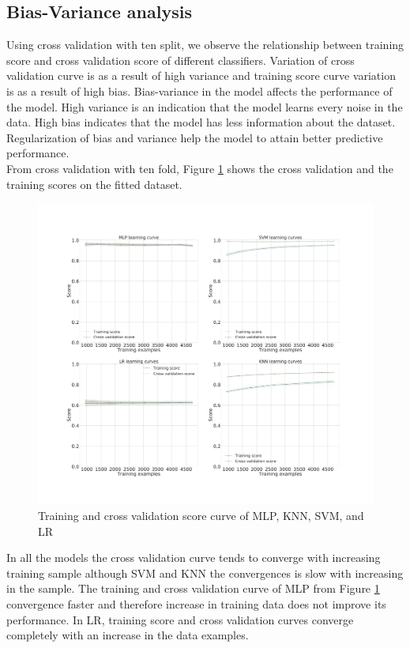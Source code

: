 \documentclass[a4paper,fleqn]{cas-dc}
\begin{document}
\subsection{Bias-Variance analysis}
Using cross validation with ten split, we observe the relationship between training score and cross validation score of different classifiers. Variation of cross validation curve is as a result of high variance and training score curve variation is as a result of high bias. Bias-variance in the model affects the performance of the model. High variance is an indication that the model learns every noise in the data. High bias indicates that the model has less information about the dataset. Regularization of bias and variance help the model to attain better predictive performance. \\

From cross validation with ten fold, Figure \ref{fig:crossval} shows the cross validation and the training scores on the fitted dataset.\\

\begin{figure}
	\begin{minipage}[H]{\linewidth}
	\centering
	\includegraphics[width=0.7\linewidth]{Figures/learning}
\end{minipage}
	\caption{Training and cross validation score curve of MLP, KNN, SVM, and LR}
	\label{fig:crossval}
\end{figure}
In all the models the cross validation curve tends to converge with increasing training sample although SVM  and KNN the convergences is slow with increasing in the sample.  The training and cross validation curve of MLP from Figure \ref{fig:crossval} convergence faster and therefore increase in training data does not improve its performance. In LR, training score and cross validation curves converge completely with an increase in the data examples.
\pagebreak
\end{document}

